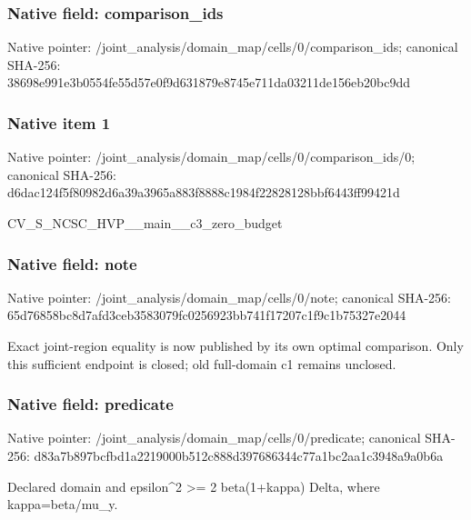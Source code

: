 \documentclass[10pt,a4paper]{article}
\begin{document}
\subsubsection{Native field: comparison\_\allowbreak{}ids}
Native pointer: /joint\_\allowbreak{}analysis/domain\_\allowbreak{}map/cells/0/comparison\_\allowbreak{}ids; canonical SHA-256: 38698e991e3b0554fe55d57e0f9d631879e8745e711da03211de156eb20bc9dd

\subsubsection{Native item 1}
Native pointer: /joint\_\allowbreak{}analysis/domain\_\allowbreak{}map/cells/0/comparison\_\allowbreak{}ids/0; canonical SHA-256: d6dac124f5f80982d6a39a3965a883f8888c1984f22828128bbf6443ff99421d

\begingroup\raggedright\sloppy CV\_\allowbreak{}S\_\allowbreak{}NCSC\_\allowbreak{}HVP\_\allowbreak{}\_\allowbreak{}main\_\allowbreak{}\_\allowbreak{}c3\_\allowbreak{}zero\_\allowbreak{}budget\par\endgroup

\subsubsection{Native field: note}
Native pointer: /joint\_\allowbreak{}analysis/domain\_\allowbreak{}map/cells/0/note; canonical SHA-256: 65d76858bc8d7afd3ceb3583079fc0256923bb741f17207c1f9c1b75327e2044

\begingroup\raggedright\sloppy Exact joint-region equality is now published by its own optimal comparison. Only this sufficient endpoint is closed;\allowbreak{} old full-domain c1 remains unclosed.\par\endgroup

\subsubsection{Native field: predicate}
Native pointer: /joint\_\allowbreak{}analysis/domain\_\allowbreak{}map/cells/0/predicate; canonical SHA-256: d83a7b897bcfbd1a2219000b512c888d397686344c77a1bc2aa1c3948a9a0b6a

\begingroup\raggedright\sloppy Declared domain and epsilon\textasciicircum{}2 >=\allowbreak{} 2 beta(1+kappa) Delta,\allowbreak{} where kappa=\allowbreak{}beta/\allowbreak{}mu\_\allowbreak{}y.\par\endgroup
\end{document}
